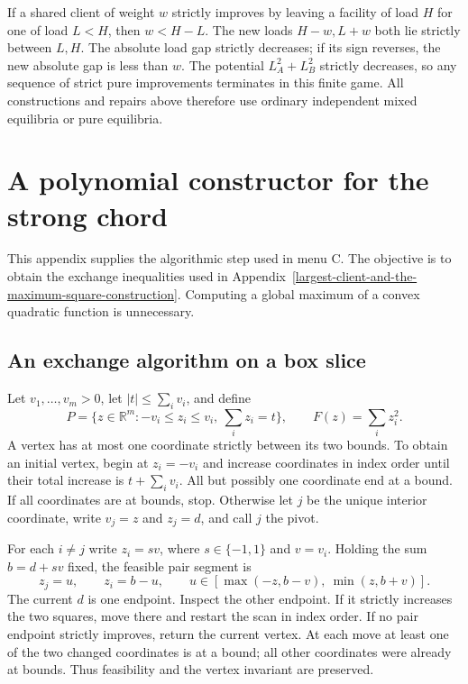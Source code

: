\documentclass[11pt]{amsart}
\numberwithin{equation}{section}
\theoremstyle{definition}
\begin{document}
If a shared client of weight \(w\) strictly improves by leaving a facility of load \(H\) for one of load \(L<H\), then \(w<H-L\). The new loads \(H-w,L+w\) both lie strictly between \(L,H\). The absolute load gap strictly decreases; if its sign reverses, the new absolute gap is less than \(w\). The potential \(L_A^2+L_B^2\) strictly decreases, so any sequence of strict pure improvements terminates in this finite game. All constructions and repairs above therefore use ordinary independent mixed equilibria or pure equilibria.



\section{A polynomial constructor for the strong chord}
\label{app:polynomial-chord}

This appendix supplies the algorithmic step used in menu C. The objective
is to obtain the exchange inequalities used in Appendix~\ref{largest-client-and-the-maximum-square-construction}. Computing a
global maximum of a convex quadratic function is unnecessary.

\subsection{An exchange algorithm on a box slice}
Let $v_1,\ldots,v_m>0$, let $|t|\le\sum_i v_i$, and define
\[
 P=\{z\in\mathbb R^m:-v_i\le z_i\le v_i,\ \sum_i z_i=t\},
 \qquad F(z)=\sum_i z_i^2.
\]
A vertex has at most one coordinate strictly between its two bounds. To
obtain an initial vertex, begin at $z_i=-v_i$ and increase coordinates in
index order until their total increase is $t+\sum_i v_i$. All but possibly
one coordinate end at a bound. If all coordinates are at bounds, stop.
Otherwise let $j$ be the unique interior coordinate, write $v_j=z$ and
$z_j=d$, and call $j$ the pivot.

For each $i\ne j$ write $z_i=sv$, where $s\in\{-1,1\}$ and $v=v_i$.
Holding the sum $b=d+sv$ fixed, the feasible pair segment is
\[
 z_j=u,\qquad z_i=b-u,\qquad
 u\in[\max(-z,b-v),\ \min(z,b+v)].
\]
The current $d$ is one endpoint. Inspect the other endpoint. If it strictly
increases the two squares, move there and restart the scan in index order.
If no pair endpoint strictly improves, return the current vertex. At each
move at least one of the two changed coordinates is at a bound; all other
coordinates were already at bounds. Thus feasibility and the vertex
invariant are preserved.
\end{document}
